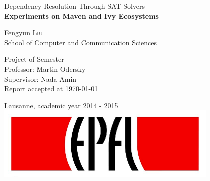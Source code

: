 \begin{titlepage}

  \begin{center}

    \vspace*{3\baselineskip}
    {\Large Dependency Resolution Through SAT Solvers \\[0.4cm] }
    {\bfseries Experiments on Maven and Ivy Ecosystems\\[1.5cm] }

    \noindent
    Fengyun \textsc{Liu} \\[0.3cm]

    \noindent
    {School of Computer and Communication Sciences \\[2cm]}

    \begin{framed}
    Project of Semester \\
    Professor: Martin Odersky \\
    Supervisor: Nada Amin \\
    Report accepted at \today
    \end{framed}

    \noindent
    Lausanne, academic year 2014 - 2015 \\[1cm]

    \includegraphics[width=0.8\textwidth]{img/epfl}~\\[1cm]



  \end{center}

\end{titlepage}
